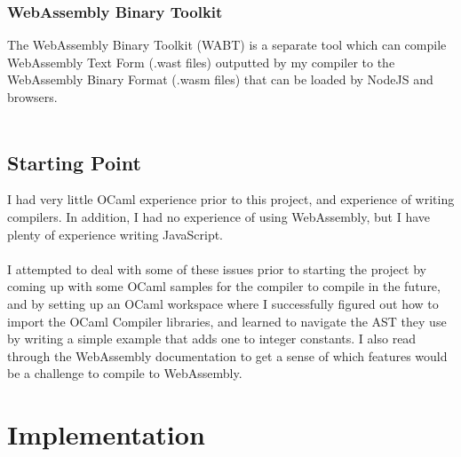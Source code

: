 \documentclass[12pt,twoside,notitlepage]{report}
\newcommand{\cfbox}[2]{%
	\colorlet{currentcolor}{.}%
	{\color{#1}%
		\fbox{\color{currentcolor}#2}}%
}
\newcommand\note[1]{\noindent\cfbox{blue}{\parbox{\textwidth}{\textcolor{blue}{#1}}}}
\begin{document}
\subsection{WebAssembly Binary Toolkit}
The WebAssembly Binary Toolkit \cite{Wabt} (WABT)  is a separate tool which can compile WebAssembly Text Form (.wast files) outputted by my compiler to the WebAssembly Binary Format (.wasm files) that can be loaded by NodeJS and browsers.
\\\\
\note{TODO Explain how to use compiler, then invoke WABT, and then explain JS code to load the WASM? The E2E tester does this so could also be explained in Evaluation chapter?}

\section{Starting Point}
I had very little OCaml experience prior to this project, and experience of writing compilers. In addition, I had no experience of using WebAssembly, but I have plenty of experience writing JavaScript.
\\\\
I attempted to deal with some of these issues prior to starting the project by coming up with some OCaml samples for the compiler to compile in the future, and by setting up an OCaml workspace where I successfully figured out how to import the OCaml Compiler libraries, and learned to navigate the AST they use by writing a simple example that adds one to integer constants. I also read through the WebAssembly documentation to get a sense of which features would be a challenge to compile to WebAssembly.

\clearpage
\chapter{Implementation}
%
%
%
\end{document}
